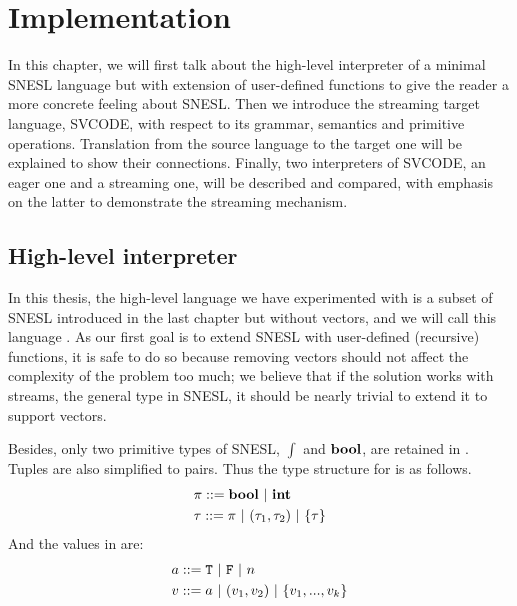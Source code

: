 
\newcommand\tr{\triangleright}
\newcommand{\proc}{\*{Proc}}
\newcommand{\bufst}{\*{BufState}}
\newcommand{\sups}{\*{Sups}}
\newcommand{\clis}{\*{Clis}}
\newcommand{\xducer}{\*{Xducer}}
\newcommand{\filling}{\texttt{Filling} \ }
\newcommand{\draining}{\texttt{Draining} \ }
\newcommand{\pin}{\texttt{Pin} \ }
\newcommand{\pout}{\texttt{Pout}}
\newcommand{\done}{\texttt{Done}}


\chapter{Implementation}

\def\Type#1#2#3{#1 \vdash_{\Sigma} \ #2 : #3 } 
\def\Eval#1#2#3{#1 \vdash_{\Phi} #2 \Eva #3 } 

In this chapter, we will first talk about the high-level interpreter of a minimal SNESL language but with extension of user-defined functions to give the reader a more concrete feeling about SNESL. 
Then we introduce the streaming target language, SVCODE, with respect to its grammar, semantics and primitive operations.
Translation from the source language to the target one will be explained to show their connections.
Finally, two interpreters of SVCODE, an eager one and a streaming one, will be described and compared, with emphasis on the latter to demonstrate the streaming mechanism.



\section{High-level interpreter}

In this thesis, the high-level language we have experimented with is a subset of SNESL introduced in the last chapter but without vectors, and we will call this language \mysnesl.
As our first goal is to extend SNESL with user-defined (recursive) functions,
it is safe to do so because removing vectors should not affect the complexity of the problem too much; we believe that if the solution works with streams, the general type in SNESL, it should be nearly trivial to extend it to support vectors. 

Besides, only two primitive types of SNESL, $\int$ and $\mathbf{bool}$, are retained in \mysnesl. 
Tuples are also simplified to pairs. 
Thus the type structure for \mysnesl is as follows.
\begin{align*} 
& \pi ::= \mathbf{bool} \ | \ \mathbf{int} \\
& \tau ::= \pi \ | \ (\tau_1,\tau_2) \ | \ \{\tau\}  
\end{align*}
And the values in \mysnesl are:
\begin{align*}
& a ::=  \mathtt{T} \ | \ \mathtt{F} \ | \ n  \\
& v ::=  a \ | \ (v_1,v_2) \ | \ \{v_1,...,v_k\} 
\end{align*}

